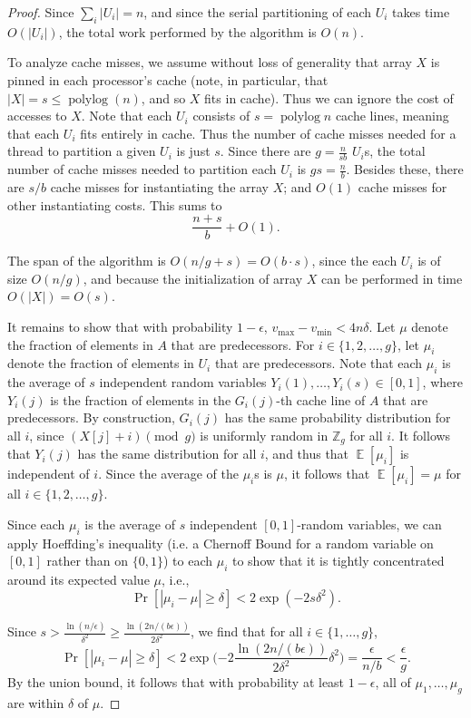 \documentclass[sigplan, 10pt, nonacm]{acmart}
\newcommand{\polylog}{\operatorname{polylog}}
\def\E{\operatorname{\mathbb{E}}}
\theoremstyle{remark}
\theoremstyle{remark}
\begin{document}
\begin{proof}
Since $\sum_i |U_i| = n$, and since the serial partitioning of each $U_i$
takes time $O(|U_i|)$, the total work performed by the algorithm is
$O(n)$.

To analyze cache misses, we assume without loss of generality that
array $X$ is pinned in each processor's cache (note, in particular,
that $|X| = s \le \polylog(n)$, and so $X$ fits in cache). Thus we can
ignore the cost of accesses to $X$. Note that each $U_i$ consists of
$s = \polylog n$ cache lines, meaning that each $U_i$ fits entirely in
cache. Thus the number of cache misses needed for a thread to
partition a given $U_i$ is just $s$. Since there are $g =
\frac{n}{sb}$ $U_i$s, the total number of cache misses needed to
partition each $U_i$ is $g s = \frac{n}{b}$. Besides these, there are
$s/b$ cache misses for instantiating the array $X$; and $O(1)$ cache
misses for other instantiating costs. This sums
to $$\frac{n+s}{b}+O(1).$$

The span of the algorithm is $O(n/g + s) = O(b\cdot s)$, since the
each $U_i$ is of size $O(n / g)$, and because the initialization of
array $X$ can be performed in time $O(|X|) = O(s)$.

It remains to show that with probability $1-\epsilon$, $v_{\text{max}}
- v_{\text{min}} < 4n\delta$. Let $\mu$ denote the fraction of
elements in $A$ that are predecessors. For $i \in \{1, 2, \ldots,
g\}$, let $\mu_i$ denote the fraction of elements in $U_i$ that are
predecessors. Note that each $\mu_i$ is the average of $s$ independent
random variables $Y_i(1), \ldots, Y_i(s) \in [0, 1]$, where $Y_i(j)$
is the fraction of elements in the $G_i(j)$-th cache line of $A$ that
are predecessors. By construction, $G_i(j)$ has the same probability
distribution for all $i$, since $(X[j] + i) \pmod g$ is uniformly
random in $\mathbb{Z}_g$ for all $i$. It follows that $Y_i(j)$ has the
same distribution for all $i$, and thus that $\E[\mu_i]$ is
independent of $i$. Since the average of the $\mu_i$s is $\mu$, it
follows that $\E[\mu_i] = \mu$ for all $i \in \{1, 2, \ldots, g\}$.

Since each $\mu_i$ is the average of $s$ independent $[0, 1]$-random
variables, we can apply Hoeffding's inequality (i.e. a Chernoff Bound
for a random variable on $[0,1]$ rather than on $\{0,1\}$) to each
$\mu_i$ to show that it is tightly concentrated around its expected
value $\mu$, i.e.,
$$\Pr[|\mu_i - \mu| \geq \delta] < 2\exp(-2s\delta^2). $$

Since $s > \frac{\ln (n/\epsilon)}{\delta^2} \ge \frac{\ln (2n / (b\epsilon))}{2\delta^2}$, we find that for all $i \in
\{1,\ldots, g\}$,
$$\Pr[|\mu_i - \mu| \geq \delta] < 2\exp\Big({-2} \frac{\ln
  (2n/(b\epsilon))}{2\delta^2} \delta^2\Big) = \frac{\epsilon}{n/b} <
\frac{\epsilon}{g}. $$ By the union bound, it follows that with
probability at least $1 - \epsilon$, all of $\mu_1, \ldots, \mu_{g}$ are within $\delta$ of $\mu$.


\end{proof}
\end{document}
